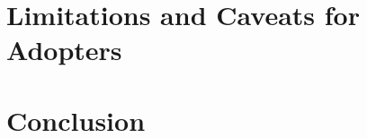 \documentclass[sigconf,review]{acmart}
\begin{document}
\section{Limitations and Caveats for Adopters}
\label{sec:limitations}


\section{Conclusion}
\label{sec:conclusion}


\begin{acks}
\end{acks}

\balance


\end{document}
